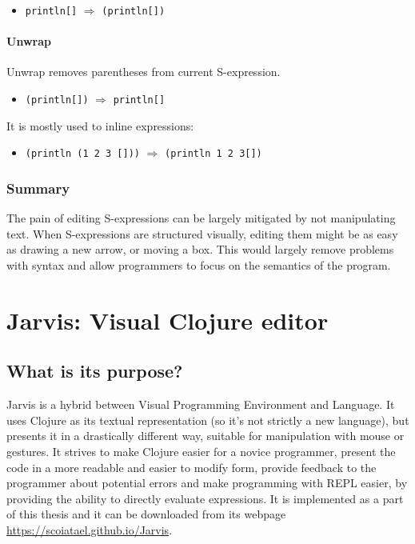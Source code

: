 \documentclass[english,mgr,shortabstract]{iithesis}
\begin{document}
\begin{itemize}
\item \lstinline|println[]| $\Rightarrow$ \lstinline|(println[])|
\end{itemize}

\subsubsection{Unwrap}
Unwrap removes parentheses from current S-expression.
\begin{itemize}
  \item \lstinline|(println[])| $\Rightarrow$ \lstinline|println[]|
\end{itemize}

It is mostly used to inline expressions:
\begin{itemize}
  \item \lstinline|(println (1 2 3 []))| $\Rightarrow$
    \lstinline|(println 1 2 3[])|
\end{itemize}

\subsection{Summary}
The pain of editing S-expressions can be largely mitigated by not manipulating
text.
When S-expressions are structured visually, editing them might be as easy as
drawing a new arrow, or moving a box.
This would largely remove problems with syntax and allow programmers to focus on
the semantics of the program.


\chapter{Jarvis: Visual Clojure editor}
\section{What is its purpose?}
Jarvis is a hybrid between Visual Programming Environment and Language.
It uses Clojure as its textual representation (so it’s not strictly a new
language), but presents it in a drastically different way, suitable for
manipulation with mouse or gestures.
It strives to make Clojure easier for a novice programmer, present the code in a
more readable and easier to modify form, provide feedback to the programmer
about potential errors and make programming with REPL easier, by providing the
ability to directly evaluate expressions.
It is implemented as a part of this thesis and it can be downloaded from its
webpage \url{https://scoiatael.github.io/Jarvis}.
\end{document}

